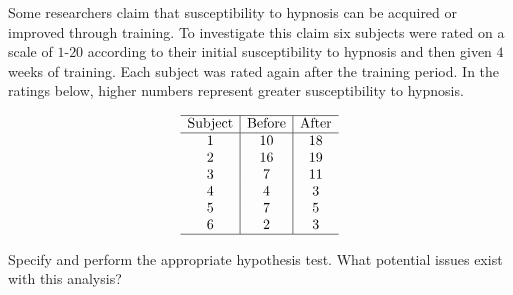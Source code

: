 
\begin{exercise}[Hypnosis]

Some researchers claim that susceptibility to hypnosis can be acquired or improved through training.
To investigate this claim six subjects were rated on a scale of $1$-$20$ according to their initial susceptibility to hypnosis and then given $4$ weeks of training.
Each subject was rated again after the training period. In the ratings below, higher numbers represent greater susceptibility to hypnosis.

\begin{align*}
    \begin{array}{c|c|c}
        \hline
        \text{Subject} & \text{Before} & \text{After} \\
        \hline
        1 & 10 & 18 \\
        2 & 16 & 19 \\
        3 & 7  & 11 \\
        4 & 4  & 3  \\
        5 & 7  & 5  \\
        6 & 2  & 3  \\ \hline
    \end{array}
\end{align*}

Specify and perform the appropriate hypothesis test.
What potential issues exist with this analysis?

\end{exercise}


\begin{solution}

\phantom{}

\end{solution}


